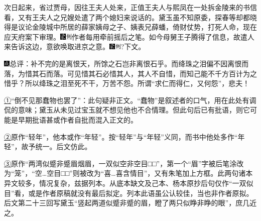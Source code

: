 次日起来，省过贾母，因往王夫人处来，正值王夫人与熙凤在一处拆金陵来的书信看，又有王夫人之兄嫂处遣了两个媳妇来说话的。黛玉虽不知原委，探春等却都晓得是议论金陵城中所居的薛家姨母之子、姨表兄薛蟠，倚财仗势，打死人命，现在应天府案下审理。{\includegraphics[width=3mm]{../Images/00006}\includegraphics[width=3mm]{../Images/00011}\footnotesize \kaishu 作者每用牵前摇后之笔。}如今母舅王子腾得了信息，故遣人来告诉这边，意欲唤取进京之意。{{\includegraphics[width=3mm]{../Images/00006}\includegraphics[width=3mm]{../Images/00011}\footnotesize \kaishu }?{下文。}}

{\includegraphics[width=3mm]{../Images/00005}总评：补不完的是离恨天，所馀之石岂非离恨石乎。而绛珠之泪偏不因离恨而落，为惜其石而落。可见惜其石必惜其人，其人不自惜，而知己能不千方百计为之惜乎？所以绛珠之泪至死不干，万苦不怨。所谓``求仁而得仁，又何怨''，悲夫！}

{\href{../Text/part0007_split_000.html\#navto_1_a}{①}``倒不见那蠢物也罢了''：此句疑非正文。``蠢物''是叙述者的口气，用在此处有调侃的意味；黛玉从未见过宝玉就不想见他也不合情理。但此句后已有批语，则它可能是早期批语甚或作者自批而混入正文的。}

{\href{../Text/part0007_split_000.html\#navto_2_a}{②}原作``轻年''，他本或作``年轻''。按``轻年''与``年轻''义同，而书中他处多作``年轻''，故予统一。后文仿此。}

{\href{../Text/part0007_split_000.html\#navto_3_a}{③}原作``两湾似蹙非蹙眉烟眉，一双似空非空目□□''，第一个``眉''字被后笔涂改为``笼''，``空\ldots{}空目□□''则被改为``喜\ldots{}喜含情目''，又有朱笔加上方框。此两句诸本异文较多，情况复杂，兹据列本。从底本缺文及己本、杨本原抄后句仅作``一双似目''看，或是作者原稿就没有最后拟定。列本此语虽公认较佳，当也非作者原拟。后文第二十三回写黛玉``竖起两道似蹙非蹙的眉，瞪了两只似睁非睁的眼''，庶几近之。}
